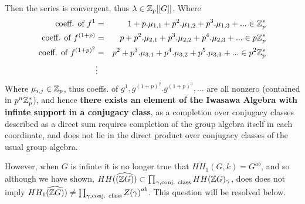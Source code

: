 Then the series is convergent, thus $\lambda\in \mathbb Z_p[[G]]$. Where
\begin{eqnarray}
\nonumber  \text{coeff. of } f^1 &=& 1+p.\mu_{1,1} +p^2.\mu_{1,2} + p^3.\mu_{1,3} +...\in \mathbb Z_p^*\\
\nonumber  \text{coeff. of } f^{(1+p)} &=& p+p^2.\mu_{2,1} +p^3.\mu_{2,2} + p^4.\mu_{2,3} +...\in p\mathbb Z_p^*\\
\nonumber  \text{coeff. of } f^ {(1+p)^2}&=& p^2+p^3.\mu_{3,1} +p^4.\mu_{3,2} + p^5.\mu_{3,3} +...\in p^2\mathbb Z_p^*\\
\nonumber 					&\vdots&
\end{eqnarray}
Where $\mu_{i,j}\in \mathbb Z_p$, thus coeffs. of $g^1, g^{(1+p)^2}. g^{(1+p)^3},\dots$ are all nonzero (contained in $p^n   \mathbb Z_p^*$), and hence \textbf {there exists an element of the Iwasawa Algebra with infinte support in a conjugacy class}, as a completion over conjugacy classes described as a direct sum requires completion of the group algebra itself in each coordinate, and does not lie in the direct product over conjugacy classes of the usual group algebra.

However, when $G$ is infinte it is no longer true that $HH_1(G,k) = G^{ab}$, and so although we have shown,  $ HH (        \widehat{(\mathbb Z G)}) \subset \prod_{\gamma , \text{conj. class}} HH (\mathbb Z G)_\gamma$, does does not imply $HH_1 \widehat{(\mathbb Z G)}) \neq \prod_{\gamma , \text{conj. class}} {Z(\gamma)}^{ab}$. This question will be resolved below.

